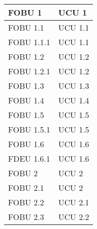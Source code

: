 \begin{longtable}{XX}
FOBU 1&UCU 1\\
\midrule
FOBU 1.1&UCU 1.1\\
\midrule
FOBU 1.1.1&UCU 1.1\\
\midrule
FOBU 1.2&UCU 1.2\\
\midrule
FOBU 1.2.1&UCU 1.2\\
\midrule
FOBU 1.3&UCU 1.3\\
\midrule
FOBU 1.4&UCU 1.4\\
\midrule
FOBU 1.5&UCU 1.5\\
\midrule
FOBU 1.5.1&UCU 1.5\\
\midrule
FOBU 1.6&UCU 1.6\\
\midrule
FDEU 1.6.1&UCU 1.6\\
\midrule
FOBU 2&UCU 2\\
\midrule
FOBU 2.1&UCU 2\\
\midrule
FOBU 2.2&UCU 2.1\\
\midrule
FOBU 2.3&UCU 2.2\\
\midrule


\end{longtable}
